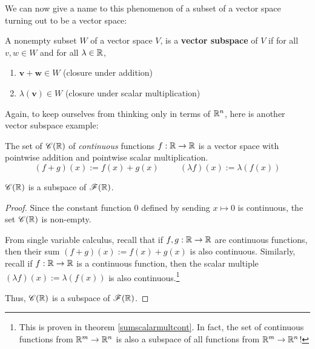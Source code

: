     We can now give a name to this phenomenon of a subset of a vector space turning out to be a vector space:
    
    \begin{definition}
    A nonempty subset $W$ of a vector space $V$, is a \textbf{vector subspace} of $V$ if for all $v, w \in W$ and for all $\lambda \in \mathbb{R}$, 
    
    \begin{enumerate}[label=(\roman*)]
        \item $\bm{v} + \bm{w} \in W$ (closure under addition)
        \item $\lambda (\bm{v}) \in W $ (closure under scalar multiplication)
    \end{enumerate}
    
    \end{definition}
    
    Again, to keep ourselves from thinking only in terms of $\mathbb{R}^n$, here is another vector subspace example:
    
    \begin{example}
    \vspace{-1em}
    \begin{theorem}\label{continuousfunctionsvspace}
    The set of $\mathscr{C}(\mathbb{R})$ of \textit{continuous} functions $f : \mathbb{R} \to \mathbb{R}$ is a vector space with pointwise addition and pointwise scalar multiplication.  $$(f + g)(x) := f(x) + g(x) \ \qquad \ (\lambda f)(x) := \lambda (f(x))$$
    \end{theorem}
    
    \begin{theorem}
    $\mathscr{C}(\mathbb{R})$ is a subspace of $\mathscr{F}(\mathbb{R})$.
    \end{theorem}
    
    \end{example}

    \begin{proof}
        Since the constant function $0$ defined by sending $x \mapsto 0$ is continuous, the set $\mathscr{C}(\mathbb{R})$ is non-empty.
    
        From single variable calculus, recall that if $f, g : \mathbb{R} \to \mathbb{R}$ are continuous functions, then their sum $(f+g)(x) := f(x) + g(x)$ is also continuous. Similarly, recall if $f: \mathbb{R} \to \mathbb{R}$ is a continuous function, then the scalar multiple $(\lambda f)(x) := \lambda(f(x))$ is also continuous.\footnote{This is proven in theorem \ref{sumscalarmultcont}.  In fact, the set of continuous functions from $\mathbb{R}^m \to \mathbb{R}^n$ is also a subspace of all functions from $\mathbb{R}^m \to \mathbb{R}^n$!}

        Thus, $\mathscr{C}(\mathbb{R})$  is a subspace of $\mathscr{F}(\mathbb{R})$.
    \end{proof}




